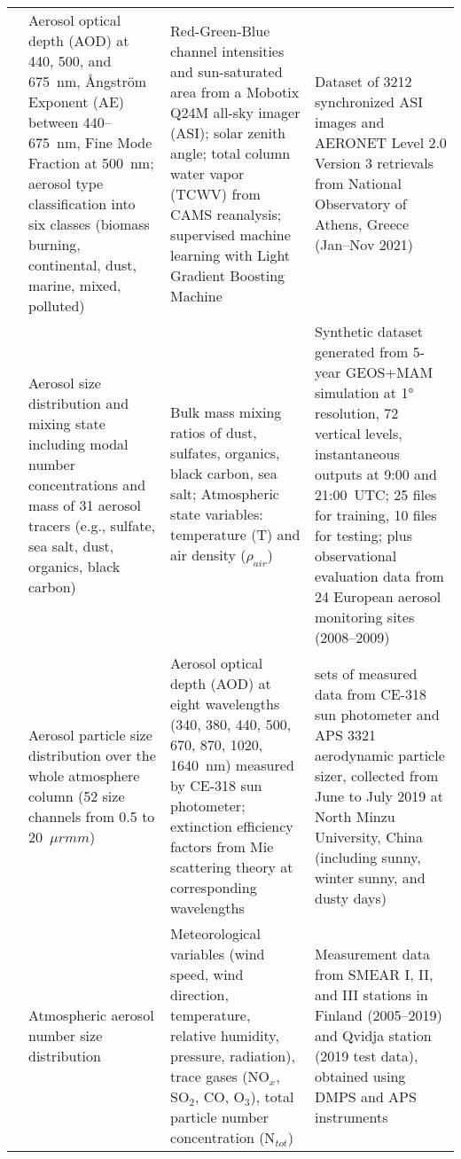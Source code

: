 \documentclass[11pt]{article}
\begin{document}
\begin{landscape}
\begin{longtable}{>{\raggedright\arraybackslash}p{2cm} 
        >{\raggedright\arraybackslash}p{4cm} 
        >{\raggedright\arraybackslash}p{10cm} 
        >{\raggedright\arraybackslash}p{6cm}}
\citet{logothetis2023aerosol} & Aerosol optical depth (AOD) at 440, 500, and 675~nm, Ångström Exponent (AE) between 440–675~nm, Fine Mode Fraction at 500~nm; aerosol type classification into six classes (biomass burning, continental, dust, marine, mixed, polluted) & Red-Green-Blue channel intensities and sun-saturated area from a Mobotix Q24M all-sky imager (ASI); solar zenith angle; total column water vapor (TCWV) from CAMS reanalysis; supervised machine learning with Light Gradient Boosting Machine & Dataset of 3212 synchronized ASI images and AERONET Level 2.0 Version 3 retrievals from National Observatory of Athens, Greece (Jan–Nov 2021) \\[6pt]

\citet{barahona2025deep} & Aerosol size distribution and mixing state including modal number concentrations and mass of 31 aerosol tracers (e.g., sulfate, sea salt, dust, organics, black carbon) & Bulk mass mixing ratios of dust, sulfates, organics, black carbon, sea salt; Atmospheric state variables: temperature (T) and air density ($\rho_{air}$) & Synthetic dataset generated from 5-year GEOS+MAM simulation at 1° resolution, 72 vertical levels, instantaneous outputs at 9:00 and 21:00~UTC; 25 files for training, 10 files for testing; plus observational evaluation data from 24 European aerosol monitoring sites (2008–2009) \\[6pt]

\citet{ren2020prediction} & Aerosol particle size distribution over the whole atmosphere column (52 size channels from 0.5 to 20~\(\mu rm m\)) & Aerosol optical depth (AOD) at eight wavelengths (340, 380, 440, 500, 670, 870, 1020, 1640~nm) measured by CE-318 sun photometer; extinction efficiency factors from Mie scattering theory at corresponding wavelengths & 500 sets of measured data from CE-318 sun photometer and APS 3321 aerodynamic particle sizer, collected from June to July 2019 at North Minzu University, China (including sunny, winter sunny, and dusty days)\\[6pt]

\citet{wu2025estimating} & Atmospheric aerosol number size distribution & Meteorological variables (wind speed, wind direction, temperature, relative humidity, pressure, radiation), trace gases (NO$_x$, SO$_2$, CO, O$_3$), total particle number concentration (N$_{tot}$) & Measurement data from SMEAR I, II, and III stations in Finland (2005–2019) and Qvidja station (2019 test data), obtained using DMPS and APS instruments \\[6pt]


\end{longtable}
\end{landscape}
\end{document}
